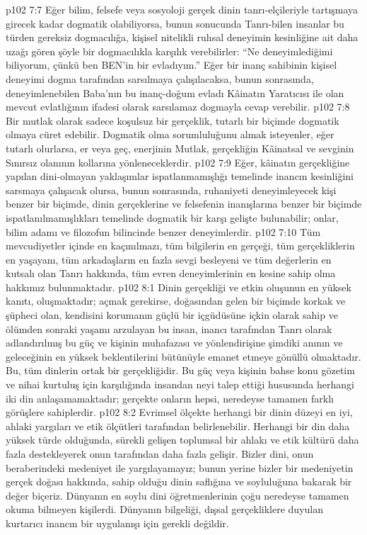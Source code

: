 \vs p102 7:7 Eğer bilim, felsefe veya sosyoloji gerçek dinin tanrı\hyp{}elçileriyle tartışmaya girecek kadar dogmatik olabiliyorsa, bunun sonucunda Tanrı\hyp{}bilen insanlar bu türden gereksiz dogmacılığa, kişisel nitelikli ruhsal deneyimin kesinliğine ait daha uzağı gören şöyle bir dogmacılıkla karşılık verebilirler: “Ne deneyimlediğimi biliyorum, çünkü ben BEN’in bir evladıyım.” Eğer bir inanç sahibinin kişisel deneyimi dogma tarafından sarsılmaya çalışılacaksa, bunun sonrasında, deneyimlenebilen Baba’nın bu inanç\hyp{}doğum evladı Kâinatın Yaratıcısı ile olan mevcut evlatlığının ifadesi olarak sarsılamaz dogmayla cevap verebilir.
\vs p102 7:8 Bir mutlak olarak sadece koşulsuz bir gerçeklik, tutarlı bir biçimde dogmatik olmaya cüret edebilir. Dogmatik olma sorumluluğunu almak isteyenler, eğer tutarlı olurlarsa, er veya geç, enerjinin Mutlak, gerçekliğin Kâinatsal ve sevginin Sınırsız olanının kollarına yönleneceklerdir.
\vs p102 7:9 Eğer, kâinatın gerçekliğine yapılan dini\hyp{}olmayan yaklaşımlar ispatlanmamışlığı temelinde inancın kesinliğini sarsmaya çalışacak olursa, bunun sonrasında, ruhaniyeti deneyimleyecek kişi benzer bir biçimde, dinin gerçeklerine ve felsefenin inanışlarına benzer bir biçimde ispatlanılmamışlıkları temelinde dogmatik bir karşı gelişte bulunabilir; onlar, bilim adamı ve filozofun bilincinde benzer deneyimlerdir.
\vs p102 7:10 Tüm mevcudiyetler içinde en kaçınılmazı, tüm bilgilerin en gerçeği, tüm gerçekliklerin en yaşayanı, tüm arkadaşların en fazla sevgi besleyeni ve tüm değerlerin en kutsalı olan Tanrı hakkında, tüm evren deneyimlerinin en kesine sahip olma hakkımız bulunmaktadır.
\vs p102 8:1 Dinin gerçekliği ve etkin oluşunun en yüksek kanıtı, oluşmaktadır; açmak gerekirse, doğasından gelen bir biçimde korkak ve şüpheci olan, kendisini korumanın güçlü bir içgüdüsüne içkin olarak sahip ve ölümden sonraki yaşamı arzulayan bu insan, inancı tarafından Tanrı olarak adlandırılmış bu güç ve kişinin muhafazası ve yönlendirişine şimdiki anının ve geleceğinin en yüksek beklentilerini bütünüyle emanet etmeye gönüllü olmaktadır. Bu, tüm dinlerin ortak bir gerçekliğidir. Bu güç veya kişinin bahse konu gözetim ve nihai kurtuluş için karşılığında insandan neyi talep ettiği hususunda herhangi iki din anlaşamamaktadır; gerçekte onların hepsi, neredeyse tamamen farklı görüşlere sahiplerdir.
\vs p102 8:2 Evrimsel ölçekte herhangi bir dinin düzeyi en iyi, ahlaki yargıları ve etik ölçütleri tarafından belirlenebilir. Herhangi bir din daha yüksek türde olduğunda, sürekli gelişen toplumsal bir ahlakı ve etik kültürü daha fazla destekleyerek onun tarafından daha fazla gelişir. Bizler dini, onun beraberindeki medeniyet ile yargılayamayız; bunun yerine bizler bir medeniyetin gerçek doğası hakkında, sahip olduğu dinin saflığına ve soyluluğuna bakarak bir değer biçeriz. Dünyanın en soylu dini öğretmenlerinin çoğu neredeyse tamamen okuma bilmeyen kişilerdi. Dünyanın bilgeliği, dışsal gerçekliklere duyulan kurtarıcı inancın bir uygulanışı için gerekli değildir.
